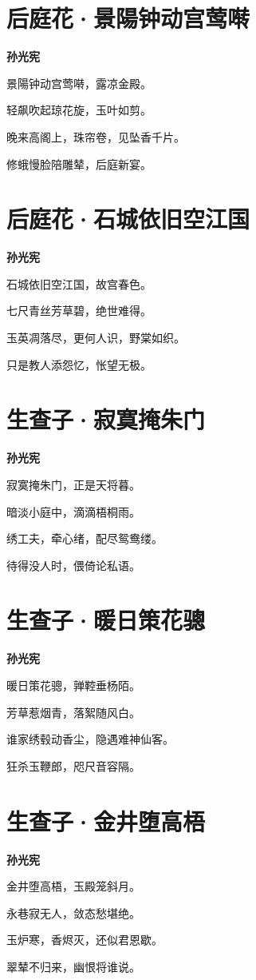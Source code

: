 \documentclass[12pt,a4paper]{ctexbook}
\begin{document}
\section{后庭花·景陽钟动宫莺啭}
\textbf{孙光宪}\par\vspace{0.5em}
景陽钟动宫莺啭，露凉金殿。\par
轻飙吹起琼花旋，玉叶如剪。\par
晚来高阁上，珠帘卷，见坠香千片。\par
修蛾慢脸陪雕辇，后庭新宴。\par

\section{后庭花·石城依旧空江国}
\textbf{孙光宪}\par\vspace{0.5em}
石城依旧空江国，故宫春色。\par
七尺青丝芳草碧，绝世难得。\par
玉英凋落尽，更何人识，野棠如织。\par
只是教人添怨忆，怅望无极。\par

\section{生查子·寂寞掩朱门}
\textbf{孙光宪}\par\vspace{0.5em}
寂寞掩朱门，正是天将暮。\par
暗淡小庭中，滴滴梧桐雨。\par
绣工夫，牵心绪，配尽鸳鸯缕。\par
待得没人时，偎倚论私语。\par

\section{生查子·暖日策花骢}
\textbf{孙光宪}\par\vspace{0.5em}
暖日策花骢，亸鞚垂杨陌。\par
芳草惹烟青，落絮随风白。\par
谁家绣毂动香尘，隐遇难神仙客。\par
狂杀玉鞭郎，咫尺音容隔。\par

\section{生查子·金井堕高梧}
\textbf{孙光宪}\par\vspace{0.5em}
金井堕高梧，玉殿笼斜月。\par
永巷寂无人，敛态愁堪绝。\par
玉炉寒，香烬灭，还似君恩歇。\par
翠辇不归来，幽恨将谁说。\par
\end{document}
